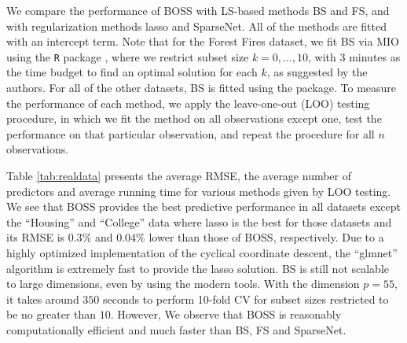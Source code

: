 We compare the performance of BOSS with LS-based methods BS and FS, and with regularization methods lasso and SparseNet. All of the methods are fitted with an intercept term. Note that for the Forest Fires dataset, we fit BS via MIO \citep{Bertsimas2016} using the {\tt{R}} package  \citep{Hastie2017}, where we restrict subset size $k=0,\dots,10$, with $3$ minutes as the time budget to find an optimal solution for each $k$, as suggested by the authors. For all of the other datasets, BS is fitted using the  package. To measure the performance of each method, we apply the leave-one-out (LOO) testing procedure, in which we fit the method on all observations except one, test the performance on that particular observation, and repeat the procedure for all $n$ observations. 

Table \ref{tab:realdata} presents the average RMSE, the average number of predictors and average running time for various methods given by LOO testing. We see that BOSS provides the best predictive performance in all datasets except the ``Housing'' and ``College'' data where lasso is the best for those datasets and its RMSE is $0.3\%$ and $0.04\%$ lower than those of BOSS, respectively. Due to a highly optimized implementation of the cyclical coordinate descent, the ``glmnet'' algorithm is extremely fast to provide the lasso solution. BS is still not scalable to large dimensions, even by using the modern tools. With the dimension $p=55$, it takes around $350$ seconds to perform 10-fold CV for subset sizes restricted to be no greater than $10$. However, We observe that BOSS is reasonably computationally efficient and much faster than BS, FS and SparseNet. 





